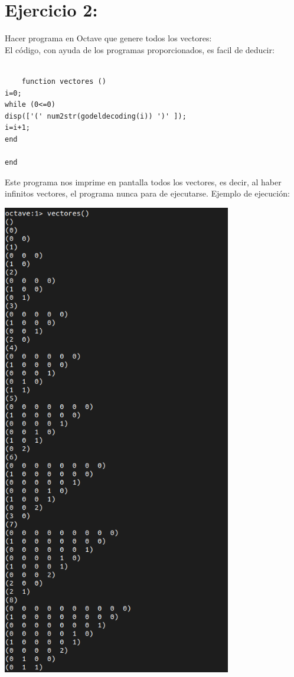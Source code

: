 \documentclass[12pt]{article}
\begin{document}
\section*{Ejercicio 2:}
Hacer programa en Octave que genere todos los vectores:\\
El código, con ayuda de los programas proporcionados, es facil de deducir:\\ \\
\begin{verbatim}
    function vectores ()
i=0;
while (0<=0)
disp(['(' num2str(godeldecoding(i)) ')' ]);
i=i+1;
end

end
\end{verbatim}
Este programa nos imprime en pantalla todos los vectores, es decir, al haber infinitos vectores, el programa nunca para de ejecutarse.
Ejemplo de ejecución:
\begin{center}
    \includegraphics[width=10cm]{vectors.png}
\end{center}
\newpage
\end{document}
